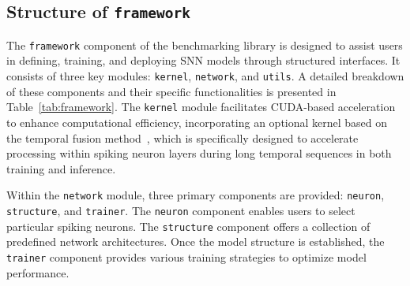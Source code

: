 
\subsection{Structure of \texttt{framework}}

The \texttt{framework} component of the benchmarking library is designed to assist users in defining, training, and deploying SNN models through structured interfaces. It consists of three key modules: \texttt{kernel}, \texttt{network}, and \texttt{utils}. A detailed breakdown of these components and their specific functionalities is presented in Table~\ref{tab:framework}. The \texttt{kernel} module facilitates CUDA-based acceleration to enhance computational efficiency, incorporating an optional kernel based on the temporal fusion method~\cite{snn_temporal_fusion_2024}, which is specifically designed to accelerate processing within spiking neuron layers during long temporal sequences in both training and inference.

Within the \texttt{network} module, three primary components are provided: \texttt{neuron}, \texttt{structure}, and \texttt{trainer}.
The \texttt{neuron} component enables users to select particular spiking neurons.
The \texttt{structure} component offers a collection of predefined network architectures.
Once the model structure is established, the \texttt{trainer} component provides various training strategies to optimize model performance.

